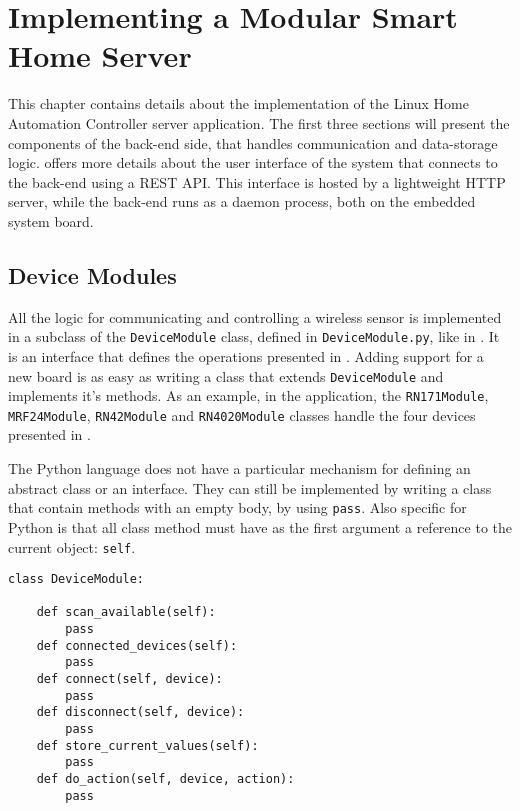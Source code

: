 \chapter{Implementing a Modular Smart Home Server}
\label{ch:implementation}

This chapter contains details about the implementation of the Linux Home Automation Controller server application. The first three sections will present the components of the back-end side, that handles communication and data-storage logic.  offers more details about the user interface of the system that connects to the back-end using a REST API. This interface is hosted by a lightweight HTTP server, while the back-end runs as a daemon process, both on the embedded system board.

\section{Device Modules}

All the logic for communicating and controlling a wireless sensor is implemented in a subclass of the \texttt{DeviceModule} class, defined in \texttt{DeviceModule.py}, like in . It is an interface that defines the operations presented in . Adding support for a new board is as easy as writing a class that extends \texttt{DeviceModule} and implements it's methods. As an example, in the application, the  \texttt{RN171Module}, \texttt{MRF24Module}, \texttt{RN42Module} and \texttt{RN4020Module} classes handle the four devices presented in .

The Python language does not have a particular mechanism for defining an abstract class or an interface. They can still be implemented by writing a class that contain methods with an empty body, by using \texttt{pass}. Also specific for Python is that all class method must have as the first argument a reference to the current object: \texttt{self}.

\lstset{language=Python, showstringspaces=false, caption=DeviceModule abstract class definition, label=lst:device-module-class}
\begin{lstlisting}
class DeviceModule:

    def scan_available(self):
        pass
    def connected_devices(self):
        pass
    def connect(self, device):
        pass
    def disconnect(self, device):
        pass
    def store_current_values(self):
        pass
    def do_action(self, device, action):
        pass
\end{lstlisting}

